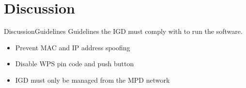 \section{Discussion}

\begin{frame}{Discussion}{Guidelines}
Guidelines the IGD must comply with to run the software.
\begin{itemize}
	\item Prevent MAC and IP address spoofing
	\item Disable WPS pin code and push button
	\item IGD must only be managed from the MPD network
\end{itemize}

\end{frame}

